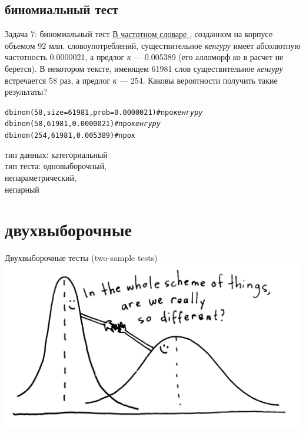 \subsection{биномиальный тест}
\begin{frame}{Задача 7: биномиальный тест}
\href{http://dict.ruslang.ru/freq.php}{В \alert{частотном словаре \citep{lyashevskaya09}}}, созданном на корпусе объемом 92 млн. словоупотреблений, существительное \textit{кенгуру} имеет абсолютную частотность 0.0000021, а предлог \textit{к} — 0.005389 (его алломорф \textit{ко} в расчет не берется). В некотором тексте, имеющем 61981 слов существительное \textit{кенгуру} встречается 58 раз, а предлог \textit{к} — 254. Каковы вероятности получить такие результаты?\\ \pause
\vfill
\footnotesize
\begin{alltt}
dbinom(58, size = 61981, prob = 0.0000021) \hfill \# про \textit{кенгуру} \\
dbinom(58, 61981, 0.0000021) \hfill \# про \textit{кенгуру}\\ 
dbinom(254, 61981, 0.005389) \hfill \# про \textit{к}
\end{alltt}
\normalsize
\vfill
тип данных: категориальный\\
тип теста: одновыборочный,\\
непараметрический,\\
непарный
\end{frame}
\section{двухвыборочные}
\begin{frame}{Двухвыборочные тесты (two-sample tests)}
\vfill
\includegraphics[width=\linewidth]{twosample.jpg}
\end{frame}
